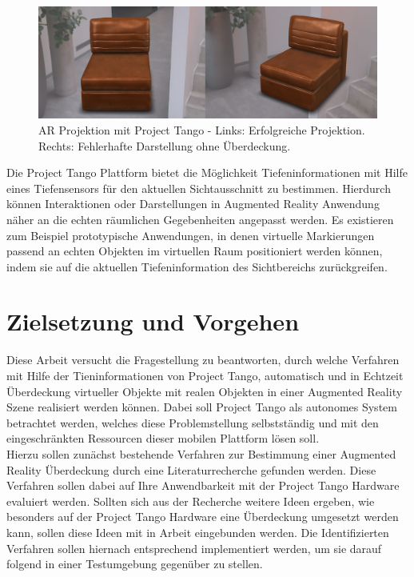 \begin{figure}[h]
  \centering
	\includegraphics[width=1.0\textwidth]{content/images/occlusion-problem.png} 

  \caption{AR Projektion mit Project Tango - Links: Erfolgreiche Projektion. Rechts: Fehlerhafte Darstellung ohne Überdeckung.}
  \label{fig:occlusion-problem}
\end{figure}

Die Project Tango Plattform bietet die Möglichkeit Tiefeninformationen mit Hilfe eines Tiefensensors für den aktuellen Sichtausschnitt zu bestimmen. Hierdurch können Interaktionen oder Darstellungen in Augmented Reality Anwendung näher an die echten räumlichen Gegebenheiten angepasst werden. Es existieren zum Beispiel prototypische Anwendungen, in denen virtuelle Markierungen passend an echten Objekten im virtuellen Raum positioniert werden können, indem sie auf die aktuellen Tiefeninformation des Sichtbereichs zurückgreifen.\\

\section{Zielsetzung und Vorgehen}

Diese Arbeit versucht die Fragestellung zu beantworten, durch welche Verfahren mit Hilfe der Tieninformationen von Project Tango, automatisch und in Echtzeit Überdeckung virtueller Objekte mit realen Objekten in einer Augmented Reality Szene realisiert werden können. Dabei soll Project Tango als autonomes System betrachtet werden, welches diese Problemstellung selbstständig und mit den eingeschränkten Ressourcen dieser mobilen Plattform lösen soll.\\

Hierzu sollen zunächst bestehende Verfahren zur Bestimmung einer Augmented Reality Überdeckung durch eine Literaturrecherche gefunden werden. Diese Verfahren sollen dabei auf Ihre Anwendbarkeit mit der Project Tango Hardware evaluiert werden. Sollten sich aus der Recherche weitere Ideen ergeben, wie besonders auf der Project Tango Hardware eine Überdeckung umgesetzt werden kann, sollen diese Ideen mit in Arbeit eingebunden werden. Die Identifizierten Verfahren sollen hiernach entsprechend implementiert werden, um sie darauf folgend in einer Testumgebung gegenüber zu stellen.\\

